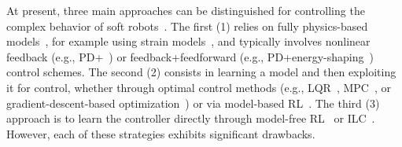 At present, three main approaches can be distinguished for controlling the complex behavior of soft robots~\citep{thuruthel2018control, della2023model}. The first (1) relies on fully physics-based models~\citep{armanini2023soft}, for example using strain models~\citep{alessi2024rod}, and typically involves nonlinear feedback (e.g., PD+~\citep{della2020model}) or feedback+feedforward (e.g., PD+energy-shaping~\citep{della2023model, caasenbrood2023control}) control schemes. The second (2) consists in learning a model and then exploiting it for control, whether through optimal control methods (e.g., \gls{LQR}~\citep{bruder2020data, haggerty2023control}, \gls{MPC}~\citep{gillespie2018learning, thuruthel2017learning, alora2023robust, alora2023data}, or gradient-descent-based optimization~\citep{bern2020soft, marques2024visuo}) or via model-based \gls{RL}~\citep{thuruthel2018model, centurelli2022closed}. The third (3) approach is to learn the controller directly through model-free \gls{RL}~\citep{morimoto2021model, jitosho2023reinforcement, alessi2024pushing} or \gls{ILC}~\citep{hofer2019iterative, pierallini2023provably}. However, each of these strategies exhibits significant drawbacks.

